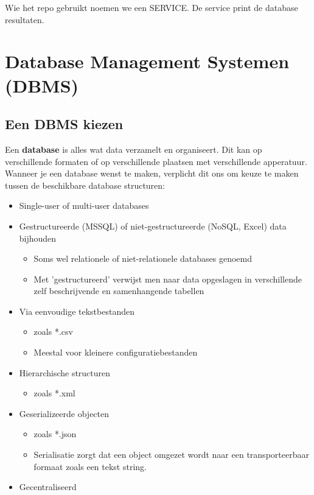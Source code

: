 \documentclass{article}
\newcommand{\bold}[1]{\textbf{#1}}
\begin{document}
Wie het repo gebruikt noemen we een SERVICE. De service print de database resultaten.


\section{Database Management Systemen (DBMS)}
\subsection{Een DBMS kiezen}
Een \bold{database} is alles wat data verzamelt en organiseert.
Dit kan op verschillende formaten of op verschillende plaatsen met verschillende apperatuur.
Wanneer je een database wenst te maken, verplicht dit ons om keuze te maken tussen de beschikbare database structuren:

\begin{itemize}
    \item Single-user of multi-user databases
    \item Gestructureerde (MSSQL) of niet-gestructureerde (NoSQL, Excel) data bijhouden
    \begin{itemize}
        \item Soms wel relationele of niet-relationele databases genoemd
        \item Met 'gestructureerd' verwijst men naar data opgeslagen in verschillende zelf beschrijvende en samenhangende tabellen
    \end{itemize}
    \item Via eenvoudige tekstbestanden 
    \begin{itemize}
        \item zoals *.csv
        \item Meestal voor kleinere configuratiebestanden
    \end{itemize}
    \item Hierarchische structuren
    \begin{itemize}
        \item zoals *.xml
    \end{itemize}
    \item Geserializeerde objecten
    \begin{itemize}
        \item zoals *.json
        \item Serialisatie zorgt dat een object omgezet wordt naar een transporteerbaar formaat zoals een tekst string.
    \end{itemize}
    \item Gecentraliseerd

\end{itemize}
\end{document}
